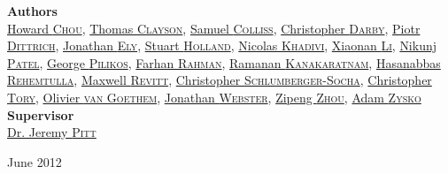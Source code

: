 \begin{titlepage}
\begin{center}
\textbf{Authors}\\
\vspace{5pt}
\href{howard.chou09@imperial.ac.uk}{Howard \textsc{Chou}}, 
\href{thomas.clayson08@imperial.ac.uk}{Thomas \textsc{Clayson}},
\href{samuel.colliss09@imperial.ac.uk}{Samuel \textsc{Colliss}}, 
\href{christopher.darby08@imperial.ac.uk}{Christopher \textsc{Darby}}, 
\href{piotr.dittrich09@imperial.ac.uk}{Piotr \textsc{Dittrich}}, 
\href{jonathan.ely09@imperial.ac.uk}{Jonathan \textsc{Ely}}, 
\href{stuart.holland09@imperial.ac.uk}{Stuart \textsc{Holland}}, 
\href{nicolas.khadivi09@imperial.ac.uk}{Nicolas \textsc{Khadivi}}, 
\href{xiaonan.li08@imperial.ac.uk}{Xiaonan \textsc{Li}}, 
\href{nikunj.patel09@imperial.ac.uk}{Nikunj \textsc{Patel}},
\href{george.pilikos08@imperial.ac.uk}{George \textsc{Pilikos}}, 
\href{farhan.rahman09@imperial.ac.uk}{Farhan \textsc{Rahman}}, 
\href{kanakaratnam.ramanan09@imperial.ac.uk}{Ramanan \textsc{Kanakaratnam}}, 
\href{hasanabbas.rehemtulla09@imperial.ac.uk}{Hasanabbas \textsc{Rehemtulla}}, 
\href{maxwell.revitt09@imperial.ac.uk}{Maxwell \textsc{Revitt}}, 
\href{chris.socha09@imperial.ac.uk}{Christopher \textsc{Schlumberger-Socha}}, 
\href{christopher.tory09@imperial.ac.uk}{Christopher \textsc{Tory}}, 
\href{olivier.van-goethem09@imperial.ac.uk}{Olivier \textsc{van Goethem}}, 
\href{jonathan.webster08@imperial.ac.uk}{Jonathan \textsc{Webster}}, 
\href{zipeng.zhou08@imperial.ac.uk}{Zipeng \textsc{Zhou}}, 
\href{adam.zysko09@imperial.ac.uk}{Adam \textsc{Zysko}} \\ \vfill
\textbf{Supervisor} \\
\vspace{5pt}
\href{mailto:j.pitt@imperial.ac.uk}{Dr. Jeremy \textsc{Pitt}}


\vfill

{\large June 2012}

\end{center}
\end{titlepage}

